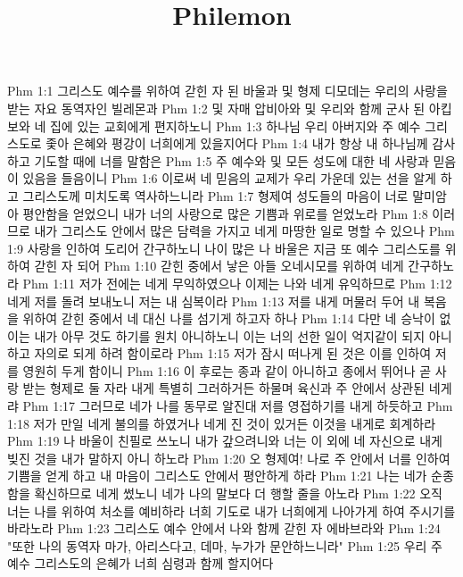 

\title{Philemon}

Phm 1:1  그리스도 예수를 위하여 갇힌 자 된 바울과 및 형제 디모데는 우리의 사랑을 받는 자요 동역자인 빌레몬과
Phm 1:2  및 자매 압비아와 및 우리와 함께 군사 된 아킵보와 네 집에 있는 교회에게 편지하노니
Phm 1:3  하나님 우리 아버지와 주 예수 그리스도로 좇아 은혜와 평강이 너희에게 있을지어다
Phm 1:4  내가 항상 내 하나님께 감사하고 기도할 때에 너를 말함은
Phm 1:5  주 예수와 및 모든 성도에 대한 네 사랑과 믿음이 있음을 들음이니
Phm 1:6  이로써 네 믿음의 교제가 우리 가운데 있는 선을 알게 하고 그리스도께 미치도록 역사하느니라
Phm 1:7  형제여 성도들의 마음이 너로 말미암아 평안함을 얻었으니 내가 너의 사랑으로 많은 기쁨과 위로를 얻었노라
Phm 1:8  이러므로 내가 그리스도 안에서 많은 담력을 가지고 네게 마땅한 일로 명할 수 있으나
Phm 1:9  사랑을 인하여 도리어 간구하노니 나이 많은 나 바울은 지금 또 예수 그리스도를 위하여 갇힌 자 되어
Phm 1:10  갇힌 중에서 낳은 아들 오네시모를 위하여 네게 간구하노라
Phm 1:11  저가 전에는 네게 무익하였으나 이제는 나와 네게 유익하므로
Phm 1:12  네게 저를 돌려 보내노니 저는 내 심복이라
Phm 1:13  저를 내게 머물러 두어 내 복음을 위하여 갇힌 중에서 네 대신 나를 섬기게 하고자 하나
Phm 1:14  다만 네 승낙이 없이는 내가 아무 것도 하기를 원치 아니하노니 이는 너의 선한 일이 억지같이 되지 아니하고 자의로 되게 하려 함이로라
Phm 1:15  저가 잠시 떠나게 된 것은 이를 인하여 저를 영원히 두게 함이니
Phm 1:16  이 후로는 종과 같이 아니하고 종에서 뛰어나 곧 사랑 받는 형제로 둘 자라 내게 특별히 그러하거든 하물며 육신과 주 안에서 상관된 네게랴
Phm 1:17  그러므로 네가 나를 동무로 알진대 저를 영접하기를 내게 하듯하고
Phm 1:18  저가 만일 네게 불의를 하였거나 네게 진 것이 있거든 이것을 내게로 회계하라
Phm 1:19  나 바울이 친필로 쓰노니 내가 갚으려니와 너는 이 외에 네 자신으로 내게 빚진 것을 내가 말하지 아니 하노라
Phm 1:20  오 형제여! 나로 주 안에서 너를 인하여 기쁨을 얻게 하고 내 마음이 그리스도 안에서 평안하게 하라
Phm 1:21  나는 네가 순종함을 확신하므로 네게 썼노니 네가 나의 말보다 더 행할 줄을 아노라
Phm 1:22  오직 너는 나를 위하여 처소를 예비하라 너희 기도로 내가 너희에게 나아가게 하여 주시기를 바라노라
Phm 1:23  그리스도 예수 안에서 나와 함께 갇힌 자 에바브라와
Phm 1:24  "또한 나의 동역자 마가, 아리스다고, 데마, 누가가 문안하느니라"
Phm 1:25  우리 주 예수 그리스도의 은혜가 너희 심령과 함께 할지어다


